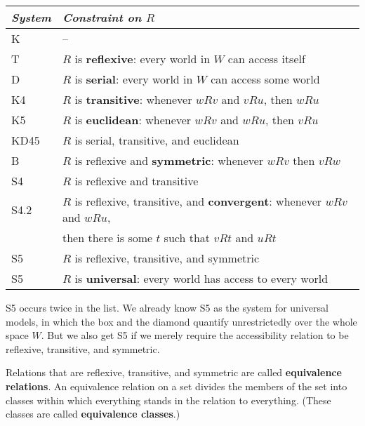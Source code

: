 \bigskip
\begin{tabular}{ll}
  \toprule
  \emph{System} & \emph{Constraint on $R$}\\
  \midrule
  K & --\\
  T & $R$ is \textbf{reflexive}: every world in $W$ can access itself\\
  D & $R$ is \textbf{serial}: every world in $W$ can access some world\\
  K4 & $R$ is \textbf{transitive}: whenever $wRv$ and $vRu$, then $wRu$\\
  K5 & $R$ is \textbf{euclidean}: whenever $wRv$ and $wRu$, then $vRu$\\
  KD45 & $R$ is serial, transitive, and euclidean\\
  B & $R$ is reflexive and \textbf{symmetric}: whenever $wRv$ then $vRw$\\
  S4 & $R$ is reflexive and transitive\\ 
  S4.2 & $R$ is reflexive, transitive, and \textbf{convergent}: whenever $wRv$ and $wRu$,\\[-0.5mm]
      & then there is some $t$ such that $vRt$ and $uRt$ \\ 
  S5 & $R$ is reflexive, transitive, and symmetric\\ 
  S5 & $R$ is \textbf{universal}: every world has access to every world\\
  \bottomrule
\end{tabular}\label{table:systems}

\bigskip


S5 occurs twice in the list. We already know S5 as the system for
universal models, in which the box and the diamond quantify unrestrictedly over
the whole space $W$. But we also get S5 if we merely require the accessibility
relation to be reflexive, transitive, and symmetric.

Relations that are reflexive, transitive, and symmetric are called
\textbf{equivalence relations}. An equivalence relation on a set divides the
members of the set into classes within which everything stands in the relation
to everything. (These classes are called \textbf{equivalence classes}.)

